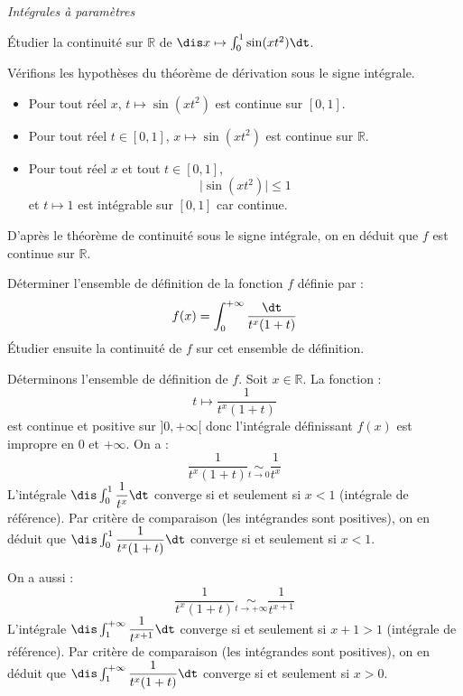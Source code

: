 \documentclass[a4paper,10pt]{report}
\begin{document}
\bigskip

\begin{center}
\textit{{ {\large Intégrales à paramètres}}}
\end{center}

\medskip

\begin{Exercice}{} Étudier la continuité sur $\mathbb{R}$ de $\dis x \mapsto \int_{0}^1 \sin(xt^2) \dt$.
\end{Exercice}

\corr Vérifions les hypothèses du théorème de dérivation sous le signe intégrale.

\begin{itemize}
\item Pour tout réel $x$, $t \mapsto \sin(xt^2)$ est continue sur $[0,1]$.
\item Pour tout réel $t \in [0,1]$,  $x \mapsto \sin(xt^2)$ est continue sur $\mathbb{R}$.
\item Pour tout réel $x$ et tout $t \in [0,1]$,
$$ \vert \sin(x t^2) \vert \leq 1$$
et $t \mapsto 1$ est intégrable sur $[0,1]$ car continue.
\end{itemize}
D'après le théorème de continuité sous le signe intégrale, on en déduit que $f$ est continue sur $\mathbb{R}$.


\begin{Exercice}{} Déterminer l'ensemble de définition de la fonction $f$ définie par :
$$ f(x) = \int_{0}^{+ \infty} \dfrac{\dt}{t^x(1+t)}$$
Étudier ensuite la continuité de $f$ sur cet ensemble de définition.
\end{Exercice}

\corr Déterminons l'ensemble de définition de $f$. Soit $x \in \mathbb{R}$. La fonction :
$$ t \mapsto  \dfrac{1}{t^x(1+t)}$$
est continue  et positive sur $]0, + \infty[$ donc l'intégrale définissant $f(x)$ est impropre en $0$ et $+ \infty$. On a :
$$  \dfrac{1}{t^x(1+t)} \underset{t \rightarrow 0}{\sim} \dfrac{1}{t^x}$$
L'intégrale $\dis \int_{0}^1 \dfrac{1}{t^x} \dt$ converge si et seulement si $x<1$ (intégrale de référence). Par critère de comparaison (les intégrandes sont positives), on en déduit que $\dis \int_{0}^1 \dfrac{1}{t^x(1+t)} \dt$ converge si et seulement si $x<1$.

\medskip

\noindent On a aussi :
$$   \dfrac{1}{t^x(1+t)} \underset{t \rightarrow + \infty}{\sim} \dfrac{1}{t^{x+1}}$$
L'intégrale $\dis \int_{1}^{+ \infty} \dfrac{1}{t^{x+1}} \dt$ converge si et seulement si $x+1>1$ (intégrale de référence). Par critère de comparaison (les intégrandes sont positives), on en déduit que $\dis \int_{1}^{+ \infty} \dfrac{1}{t^x(1+t)} \dt$ converge si et seulement si $x>0$.
\end{document}

